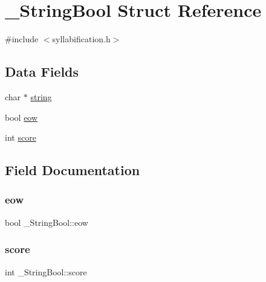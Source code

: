 \hypertarget{struct__StringBool}{}\section{\+\_\+\+String\+Bool Struct Reference}
\label{struct__StringBool}


{\ttfamily \#include $<$syllabification.\+h$>$}

\subsection*{Data Fields}
\begin{DoxyCompactItemize}
\item 
char $\ast$ \mbox{\hyperlink{struct__StringBool_a87c49f9dd316545ad28c1d53bc7548e0}{string}}
\item 
bool \mbox{\hyperlink{struct__StringBool_a107dddb18b71440f00a640eef3836974}{eow}}
\item 
int \mbox{\hyperlink{struct__StringBool_a34a88c155be65a283d3dc85007924702}{score}}
\end{DoxyCompactItemize}


\subsection{Field Documentation}
\mbox{\label{struct__StringBool_a107dddb18b71440f00a640eef3836974}} 
\subsubsection{\texorpdfstring{eow}{eow}}
{\footnotesize\ttfamily bool \+\_\+\+String\+Bool\+::eow}

\mbox{\label{struct__StringBool_a34a88c155be65a283d3dc85007924702}} 
\subsubsection{\texorpdfstring{score}{score}}
{\footnotesize\ttfamily int \+\_\+\+String\+Bool\+::score}

\mbox{\label{struct__StringBool_a87c49f9dd316545ad28c1d53bc7548e0}} 
